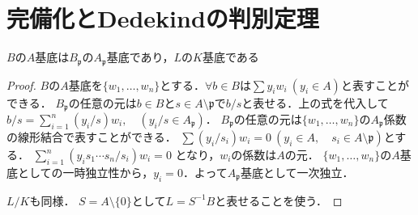 \section{完備化とDedekindの判別定理}

\begin{screen}
  $B$の$A$基底は$B_\mathfrak{p}$の$A_\mathfrak{p}$基底であり，$L$の$K$基底である
\end{screen}
\begin{proof}
  $B$の$A$基底を$\{w_1,\ldots,w_n\}$とする．$\forall b\in B$は$\sum y_iw_i\ (y_i\in A)$と表すことができる．
  $B_\mathfrak{p}$の任意の元は$b\in B$と$s\in A\setminus\mathfrak{p}$で$b/s$と表せる．上の式を代入して$b/s=\sum_{i=1}^n(y_i/s)w_i,\quad (y_i/s\in A_\mathfrak{p})$．
  $B_\mathfrak{p}$の任意の元は$\{w_1,\ldots,w_n\}$の$A_\mathfrak{p}$係数の線形結合で表すことができる．
  $\sum (y_i/s_i)w_i=0\ (y_i\in A,\quad s_i\in A\setminus\mathfrak{p})$とする．
  $\sum_{i=1}^n (y_is_1\cdots s_n/s_i)w_i=0$
  となり，$w_i$の係数は$A$の元．
  $\{w_1,\ldots,w_n\}$の$A$基底としての一時独立性から，$y_i=0$．よって$A_\mathfrak{p}$基底として一次独立．

  $L/K$も同様．
  $S=A\setminus\{0\}$として$L=S^{-1}B$と表せることを使う．
\end{proof}

